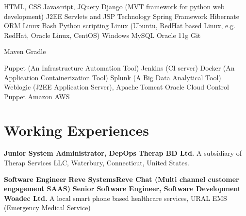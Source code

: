 \documentclass[11pt,a4paper,sans]{moderncv}
\begin{document}
{
HTML, CSS
\newline Javascript, JQuery
\newline Django (MVT framework for python web development)
\newline J2EE Servlets and JSP Technology
\newline Spring Framework
\newline Hibernate ORM
}
{
Linux Bash
\newline Python scripting
}
{
Linux (Ubuntu, RedHat based Linux, e.g. RedHat, Oracle Linux, CentOS)
\newline Windows
}
{
MySQL
\newline Oracle 11g
}
{
Git
}

{
Maven
\newline Gradle
}

{
Puppet (An Infrastructure Automation Tool)
\newline Jenkins (CI server)
\newline Docker (An Application Containerization Tool)
\newline Splunk (A Big Data Analytical Tool)
\newline Weblogic (J2EE Application Server), Apache Tomcat
\newline Oracle Cloud Control
\newline Puppet
\newline Amazon AWS
}



\section{Working Experiences}
{
\textbf{Junior System Administrator, DepOps\newline}
\textbf{Therap BD Ltd.\newline}
A subsidiary of Therap Services LLC, Waterbury, Connecticut, United States.
}

{
\textbf{Software Engineer\newline}
\textbf{Reve Systems\newline Reve Chat (Multi channel customer engagement SAAS)}
}
{
\textbf{Senior Software Engineer, Software Development\newline}
\textbf{Woadec Ltd.\newline}
A local smart phone based healthcare services, URAL EMS (Emergency Medical Service)
}
\end{document}

